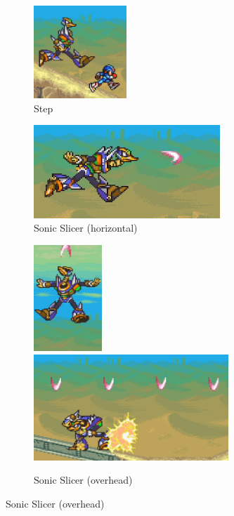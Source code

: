 \begin{figure}[htp]
	\ContinuedFloat
	\centering
	\begin{subfigure}{0.3\linewidth}
		\centering
		\includegraphics[height=3.5cm]{figures/X2/Overdrive_ostrich/Ostrich_run&jump.png}
		\caption{Step}
	\end{subfigure}
	\begin{subfigure}{0.5\linewidth}
		\centering
		\includegraphics[height= 3.5cm,width=\linewidth]{figures/X2/Overdrive_ostrich/Ostrich_sonic_slicer.png}
		\caption{Sonic Slicer (horizontal)}
	\end{subfigure}
	\begin{subfigure}{\linewidth}
		\centering
		\includegraphics[height=4cm]{figures/X2/Overdrive_ostrich/Ostrich_charged_SS.png}
		\includegraphics[height=4cm]{figures/X2/Overdrive_ostrich/Ostrich_charged_SS_2.png}
		\caption{Sonic Slicer (overhead)}
	\end{subfigure}
\end{figure}

